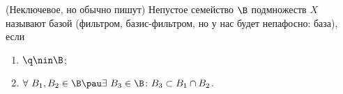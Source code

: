 (Неключевое, но обычно пишут)
 	Непустое семейство $\B$ подмножеств $X$ называют базой (фильтром, базис-фильтром, но у нас будет непафосно: база), если
 	\begin{enumerate}
 	  \item $\q\nin \B$;
 	  \item $\forall\  B_1,B_2\in\B\pau \exists\  B_3\in\B\colon B_3\subset B_1\cap B_2$.
 	\end{enumerate}
 